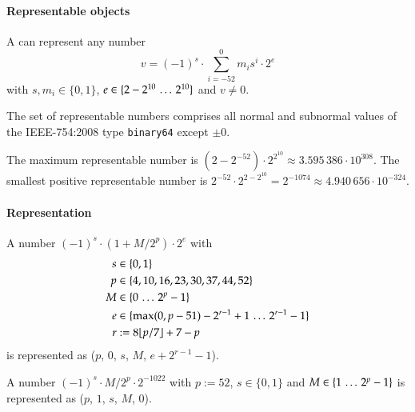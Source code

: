 \paragraph{Representable objects}

A \DborBinaryRationalValue{} can represent any number
\begin{equation}
    v = (-1)^s \cdot \sum_{i = -52}^0 m_i s^i \cdot 2^e
\end{equation}
with $s, m_i \in \{0, 1\}$, $e \in \{2 - 2^{10} \,\ldots\, 2^{10}\}$ and $v \ne 0$.

The set of representable numbers comprises all normal and subnormal values of the IEEE-754:2008 type
\texttt{binary64} except $\pm 0$.

\smallskip
The maximum representable number is $(2 - 2^{-52}) \cdot 2^{2^{10}} \approx 3.595\,386 \cdot 10^{308}$.
The smallest positive representable number is $2^{-52} \cdot 2^{2-2^{10}} = 2^{-1074}
\approx 4.940\,656 \cdot 10^{-324}$.

\paragraph{Representation}

A number $(-1)^s \cdot (1 + M/2^p) \cdot 2^e$ with
\begin{align*}
    s & \in \{0, 1\} \\
    p & \in \{4, 10, 16, 23, 30, 37, 44, 52\} \\
    M & \in \{0 \,\ldots\, 2^p - 1\} \\
    e & \in \{\max(0, p - 51) - 2^{r - 1} + 1 \,\ldots\, 2^{r - 1} - 1\} \\
    r & := 8 \lfloor p / 7 \rfloor + 7 - p
\end{align*}%
is represented as
\DborBinaryRationalToken*($p$, $0$, $s$, $M$, $e + 2^{r - 1} - 1$).

A number $(-1)^s \cdot M/2^p \cdot 2^{-1022}$ with $p := 52$, $s \in \{0, 1\}$ and
$M \in \{1 \,\ldots\, 2^p - 1\}$ is represented as \DborBinaryRationalToken*($p$, $1$, $s$, $M$, $0$).

